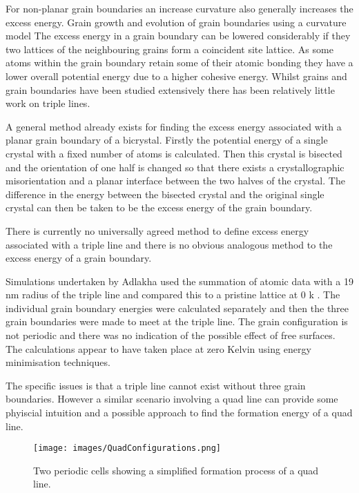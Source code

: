 \documentclass[12pt,a4paper]{book}
\begin{document}
For non-planar grain boundaries an increase curvature also generally increases the excess energy. Grain growth and evolution of grain boundaries using a curvature model  The excess energy in a grain boundary can be lowered considerably if they two lattices of the neighbouring grains form a coincident site lattice. As some atoms within the grain boundary retain some of their atomic bonding they have a lower overall potential energy due to a higher cohesive energy. Whilst grains and grain boundaries have been studied extensively there has been relatively little work on triple lines.

A general method already exists for finding the excess energy associated with a planar grain boundary of a bicrystal. Firstly the potential energy of a single crystal with a fixed number of atoms is calculated. Then this crystal is bisected and the orientation of one half is changed so that there exists a crystallographic misorientation and a planar interface between the two halves of the crystal. The difference in the energy between the bisected crystal and the original single crystal can then be taken to be the excess energy of the grain boundary.

There is currently no universally agreed method to define excess energy associated with a triple line and there is no obvious analogous method to the excess energy of a grain boundary.

Simulations undertaken by Adlakha used the summation of atomic data with a 19 nm radius of the triple line and compared this to a pristine lattice at 0 k \cite{Adlakha2015}. The individual grain boundary energies were calculated separately and then the three grain boundaries were made to meet at the triple line. The grain configuration is not periodic and there was no indication of the possible effect of free surfaces. The calculations appear to have taken place at zero Kelvin using energy minimisation techniques. 

 The specific issues is that a triple line cannot exist without three grain boundaries. However a similar scenario involving a quad line can provide some phyiscial intuition and a possible approach to find the formation energy of a quad line. 

\begin{figure}[H]
	\centering
	\texttt{[image: images/QuadConfigurations.png]} 
\label{fig:1}
\caption{Two periodic cells showing a simplified formation process of a quad line.}
\end{figure}
\end{document}
